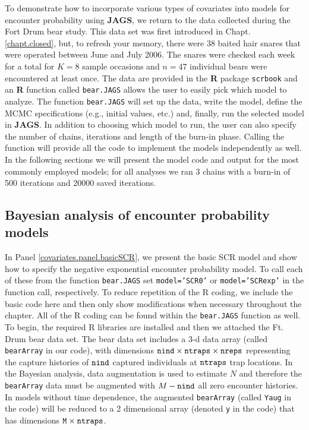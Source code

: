 To demonstrate how to incorporate various types of covariates into
models for encounter probability using {\bf JAGS}, we return to the
data collected during the Fort Drum bear study.  This data set was first
introduced in Chapt. \ref{chapt.closed}, but, to refresh your memory,
there were 38 baited hair snares that were operated between June and
July 2006.  The snares were checked each week for a total for $K=8$
sample occasions and $n=47$ individual bears were encountered at least
once.  The data are provided in the {\bf R} package \mbox{\tt scrbook}
and an {\bf R} function called {\tt bear.JAGS} allows the user to
easily pick which model to analyze.  The function {\tt bear.JAGS} will
set up the data, write the model, define the MCMC specifications
(e.g., initial values, etc.) and, finally, run the selected model in
{\bf JAGS}. In addition to choosing which model to run, the user can
also specify the number of chains, iterations and length of the
burn-in phase. Calling the function will provide all the code to
implement the models independently as well.  In the following sections
we will present the model code and output for the most commonly
employed models; for all analyses we ran 3 chains with a burn-in of
500 iterations and 20000 saved iterations.

\subsection{Bayesian analysis of encounter probability models}

In Panel \ref{covariates.panel.basicSCR}, we present the basic SCR
model and show how to specify the negative exponential encounter
probability model.
  To call each of these from the function {\tt bear.JAGS} set
{\tt model='SCR0'} or {\tt model='SCRexp'} in the function call,
respectively.  To reduce repetition of the R coding, we include the
basic code here and then only show modifications when necessary throughout
the chapter.  All of the R coding can be found within the {\tt bear.JAGS}
function as well.   To begin, the required R libraries are installed and 
then we attached the Ft. Drum bear data set.  The bear data set includes 
a 3-d data array (called \mbox{\tt bearArray} in our code), 
with dimensions $\mbox{\tt nind} \times \mbox{\tt ntraps} \times \mbox{\tt nreps}$ 
representing the capture histories of $\mbox{\tt nind}$ captured individuals at
$\mbox{\tt ntraps}$ trap locations.  In the Bayesian analysis, data augmentation is
used to estimate $N$ and therefore the \mbox{\tt bearArray} data must be augmented with
$M - \mbox{\tt nind}$ all zero encounter histories.  In models without time dependence,
the augmented \mbox{\tt bearArray} (called \mbox{\tt Yaug} in the code) will be reduced
to a 2 dimensional array (denoted \mbox{\tt y} in the code) that has dimensions 
 $\mbox{\tt M} \times \mbox{\tt ntraps}$.

